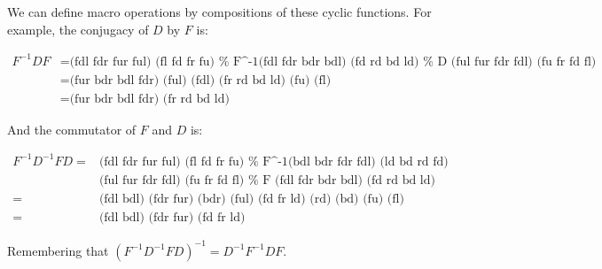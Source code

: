 We can define macro operations by compositions of these cyclic
functions.  For example, the conjugacy of $D$ by $F$ is:

\begin{align*}
  F^{-1}DF 
  &= \text{(fdl fdr fur ful) (fl fd fr fu)     %
           (fdl fdr bdr bdl) (fd rd bd ld)     %
           (ful fur fdr fdl) (fu fr fd fl)} \\ %
  &= \text{(fur bdr bdl fdr) (ful) (fdl) (fr rd bd ld) (fu) (fl)} \\
  &= \text{(fur bdr bdl fdr) (fr rd bd ld)}
\end{align*}
  
And the commutator of $F$ and $D$ is:

\begin{align*}
  F^{-1}D^{-1}FD
  = &\text{(fdl fdr fur ful) (fl fd fr fu)     %
           (bdl bdr fdr fdl) (ld bd rd fd)} \\ %
    &\text{(ful fur fdr fdl) (fu fr fd fl)     %
           (fdl fdr bdr bdl) (fd rd bd ld)} \\ %
  = &\text{(fdl bdl) (fdr fur) (bdr) (ful) (fd fr ld) (rd) (bd) (fu) (fl)} \\
  = &\text{(fdl bdl) (fdr fur) (fd fr ld)}
\end{align*}
  
Remembering that $(F^{-1}D^{-1}FD)^{-1} = D^{-1}F^{-1}DF$.
